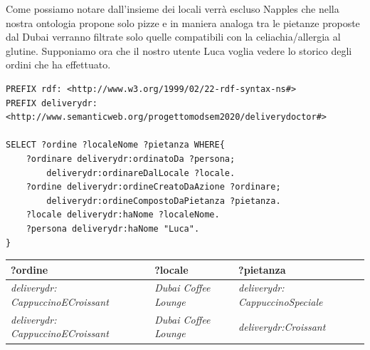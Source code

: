 \documentclass[12pt]{article}
\begin{document}
\newline
\newline
Come possiamo notare dall'insieme dei locali verrà escluso Napples che nella nostra ontologia propone solo pizze e in maniera analoga tra le pietanze proposte dal Dubai verranno filtrate solo quelle compatibili con la celiachia/allergia al glutine.
\newline
Supponiamo ora che il nostro utente Luca voglia vedere lo storico degli ordini che ha effettuato.
\begin{lstlisting}[language=SPARQL]
PREFIX rdf: <http://www.w3.org/1999/02/22-rdf-syntax-ns#>
PREFIX deliverydr:
<http://www.semanticweb.org/progettomodsem2020/deliverydoctor#>

SELECT ?ordine ?localeNome ?pietanza WHERE{
    ?ordinare deliverydr:ordinatoDa ?persona;
        deliverydr:ordinareDalLocale ?locale.
    ?ordine deliverydr:ordineCreatoDaAzione ?ordinare;
        deliverydr:ordineCompostoDaPietanza ?pietanza.
    ?locale deliverydr:haNome ?localeNome.
    ?persona deliverydr:haNome "Luca".
}
\end{lstlisting}
\begin{tabularx}{\textwidth} { 
  | >{\centering\arraybackslash}X 
  | >{\centering\arraybackslash}X
  | >{\centering\arraybackslash}X |}
 \hline
 \textbf{?ordine} & \textbf{?locale} & \textbf{?pietanza} \\
 \hline
 \textit{deliverydr: CappuccinoECroissant} & \textit{Dubai Coffee Lounge} & \textit{deliverydr: CappuccinoSpeciale}  \\
 \hline
 \textit{deliverydr: CappuccinoECroissant} & \textit{Dubai Coffee Lounge} & \textit{deliverydr:Croissant}\\
\hline
\end{tabularx}
\end{document}
